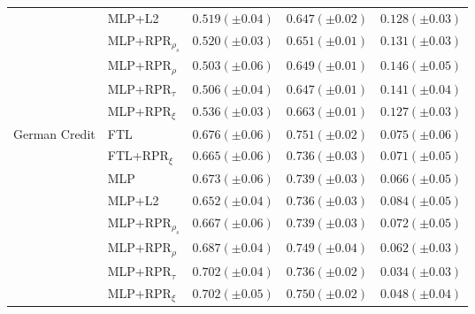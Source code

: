 \begin{tabular}{lllll}
 & MLP+L2 & $0.519 (\pm0.04)$ & $0.647 (\pm0.02)$ & $0.128 (\pm0.03)$ \\
 & MLP+RPR$_{\rho_s}$ & $0.520 (\pm0.03)$ & $0.651 (\pm0.01)$ & $0.131 (\pm0.03)$ \\
 & MLP+RPR$_{\rho}$ & $0.503 (\pm0.06)$ & $0.649 (\pm0.01)$ & $0.146 (\pm0.05)$ \\
 & MLP+RPR$_{\tau}$ & $0.506 (\pm0.04)$ & $0.647 (\pm0.01)$ & $0.141 (\pm0.04)$ \\
 & MLP+RPR$_{\xi}$ & $0.536 (\pm0.03)$ & $0.663 (\pm0.01)$ & $0.127 (\pm0.03)$ \\
\cline{1-5}
\multirow[t]{8}{*}{German Credit} & FTL & $0.676 (\pm0.06)$ & $0.751 (\pm0.02)$ & $0.075 (\pm0.06)$ \\
 & FTL+RPR$_{\xi}$ & $0.665 (\pm0.06)$ & $0.736 (\pm0.03)$ & $0.071 (\pm0.05)$ \\
 & MLP & $0.673 (\pm0.06)$ & $0.739 (\pm0.03)$ & $0.066 (\pm0.05)$ \\
 & MLP+L2 & $0.652 (\pm0.04)$ & $0.736 (\pm0.03)$ & $0.084 (\pm0.05)$ \\
 & MLP+RPR$_{\rho_s}$ & $0.667 (\pm0.06)$ & $0.739 (\pm0.03)$ & $0.072 (\pm0.05)$ \\
 & MLP+RPR$_{\rho}$ & $0.687 (\pm0.04)$ & $0.749 (\pm0.04)$ & $0.062 (\pm0.03)$ \\
 & MLP+RPR$_{\tau}$ & $0.702 (\pm0.04)$ & $0.736 (\pm0.02)$ & $0.034 (\pm0.03)$ \\
 & MLP+RPR$_{\xi}$ & $0.702 (\pm0.05)$ & $0.750 (\pm0.02)$ & $0.048 (\pm0.04)$ \\
\cline{1-5}
\bottomrule
\end{tabular}
